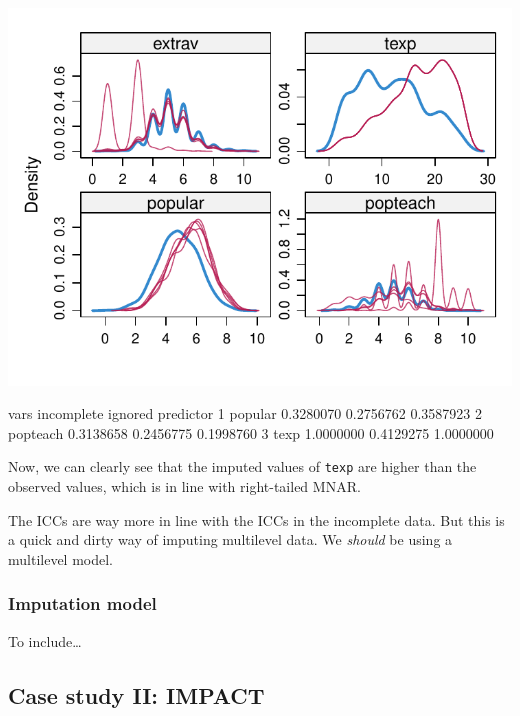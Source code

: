 \documentclass[
]{jss}
\begin{document}
\begin{CodeChunk}


\begin{center}\includegraphics{Manuscript_files/figure-latex/pop_predictor_eval-1} \end{center}

\begin{CodeOutput}
      vars incomplete   ignored predictor
1  popular  0.3280070 0.2756762 0.3587923
2 popteach  0.3138658 0.2456775 0.1998760
3     texp  1.0000000 0.4129275 1.0000000
\end{CodeOutput}
\end{CodeChunk}

Now, we can clearly see that the imputed values of \texttt{texp} are
higher than the observed values, which is in line with right-tailed
MNAR.

The ICCs are way more in line with the ICCs in the incomplete data. But
this is a quick and dirty way of imputing multilevel data. We
\emph{should} be using a multilevel model.

\hypertarget{imputation-model-2}{%
\subsubsection{Imputation model}\label{imputation-model-2}}

To include\ldots{}

\hypertarget{case-study-ii-impact}{%
\subsection{Case study II: IMPACT}\label{case-study-ii-impact}}
\end{document}

